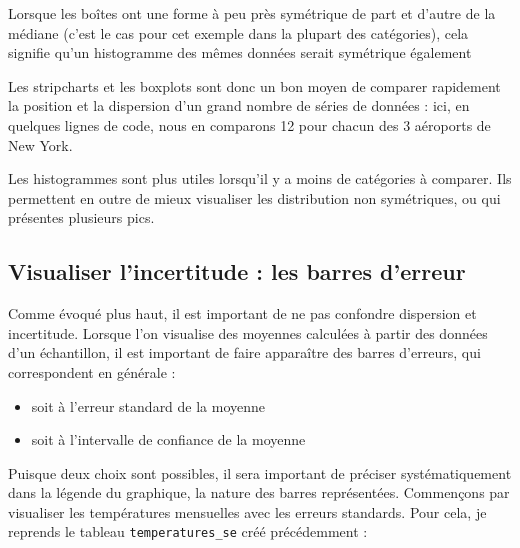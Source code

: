\documentclass[
  a4paper,
  DIV=11,
  numbers=noendperiod,
  oneside]{scrreprt}
\providecommand{\tightlist}{%
  \setlength{\itemsep}{0pt}\setlength{\parskip}{0pt}}\usepackage{longtable,booktabs,array}
\begin{document}
Lorsque les boîtes ont une forme à peu près symétrique de part et
d'autre de la médiane (c'est le cas pour cet exemple dans la plupart des
catégories), cela signifie qu'un histogramme des mêmes données serait
symétrique également

Les stripcharts et les boxplots sont donc un bon moyen de comparer
rapidement la position et la dispersion d'un grand nombre de séries de
données : ici, en quelques lignes de code, nous en comparons 12 pour
chacun des 3 aéroports de New York.

Les histogrammes sont plus utiles lorsqu'il y a moins de catégories à
comparer. Ils permettent en outre de mieux visualiser les distribution
non symétriques, ou qui présentes plusieurs pics.

\hypertarget{visualiser-lincertitude-les-barres-derreur}{%
\subsection{Visualiser l'incertitude : les barres
d'erreur}\label{visualiser-lincertitude-les-barres-derreur}}

Comme évoqué plus haut, il est important de ne pas confondre dispersion
et incertitude. Lorsque l'on visualise des moyennes calculées à partir
des données d'un échantillon, il est important de faire apparaître des
barres d'erreurs, qui correspondent en générale :

\begin{itemize}
\tightlist
\item
  soit à l'erreur standard de la moyenne
\item
  soit à l'intervalle de confiance de la moyenne
\end{itemize}

Puisque deux choix sont possibles, il sera important de préciser
systématiquement dans la légende du graphique, la nature des barres
représentées. Commençons par visualiser les températures mensuelles avec
les erreurs standards. Pour cela, je reprends le tableau
\texttt{temperatures\_se} créé précédemment :
\end{document}
